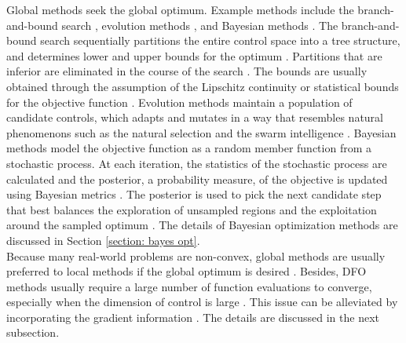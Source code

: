 Global methods seek the global optimum. 
Example methods include the branch-and-bound search \cite{Branch and Bound}, evolution methods \cite{evolution review}, and 
Bayesian methods \cite{practical Bayesian, Locatelli, prob of improve}. 
The branch-and-bound search sequentially partitions the entire control space into a tree structure, and
determines lower and upper bounds for the optimum
\cite{Branch and Bound}. Partitions that are inferior are eliminated 
in the course of the search \cite{Branch and Bound}. The bounds are usually obtained through the assumption of the
Lipschitz continuity or statistical bounds for the objective function \cite{Branch and Bound}. 
Evolution methods maintain a population
of candidate controls, which adapts and mutates in a way that resembles natural phenomenons
such as the natural selection \cite{genetic algo, cuckoo} 
and the swarm intelligence \cite{particle swarm}.
Bayesian methods model the objective function as a random member function from a stochastic process.
At each iteration, the statistics of the stochastic process are calculated 
and the posterior, a probability measure, of the objective 
is updated using Bayesian metrics \cite{practical Bayesian, review EI}. 
The posterior is used to pick the next candidate step
that best balances the exploration of unsampled regions and the exploitation around the sampled
optimum \cite{Locatelli, jones1998, GP bandit}. The details of Bayesian optimization methods are discussed in Section \ref{section: bayes opt}.\\

Because many real-world problems are non-convex, global methods are usually preferred to local methods
if the global optimum is desired \cite{gradfreereview}. Besides, DFO methods usually require
a large number of function evaluations to converge, especially when the dimension of control is large
\cite{gradfreereview}. This issue can be alleviated by incorporating the gradient information
\cite{derivative RKHS, grad coKriging}.
The details are discussed in the next subsection.\\

